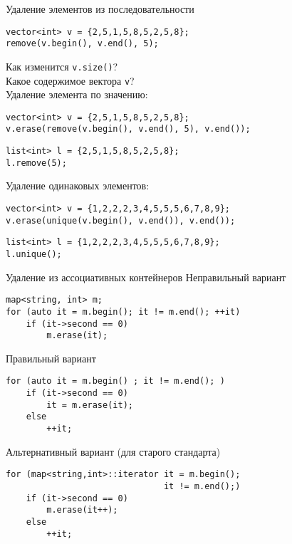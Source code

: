 \documentclass[aspectration=1610,t]{beamer}
\begin{document}
\begin{frame}[fragile]{Удаление элементов из последовательности}
\begin{lstlisting}
vector<int> v = {2,5,1,5,8,5,2,5,8};
remove(v.begin(), v.end(), 5);
\end{lstlisting}
Как изменится \texttt{v.size()}?\quad {}\\ 
Какое содержимое вектора \texttt{v}?\quad {}
\pause\pause\\\medskip
Удаление элемента по значению:
\begin{lstlisting}
vector<int> v = {2,5,1,5,8,5,2,5,8};
v.erase(remove(v.begin(), v.end(), 5), v.end());
\end{lstlisting}
\begin{lstlisting}
list<int> l = {2,5,1,5,8,5,2,5,8};
l.remove(5);
\end{lstlisting}
\pause
Удаление одинаковых элементов:
\begin{lstlisting}
vector<int> v = {1,2,2,2,3,4,5,5,5,6,7,8,9};
v.erase(unique(v.begin(), v.end()), v.end());
\end{lstlisting}
\begin{lstlisting}
list<int> l = {1,2,2,2,3,4,5,5,5,6,7,8,9};
l.unique();
\end{lstlisting}
\end{frame}


\begin{frame}[fragile]{Удаление из ассоциативных контейнеров}
Неправильный вариант
\begin{lstlisting}
map<string, int> m;
for (auto it = m.begin(); it != m.end(); ++it)
    if (it->second == 0)
        m.erase(it);
\end{lstlisting}
\pause
Правильный вариант
\begin{lstlisting}
for (auto it = m.begin() ; it != m.end(); )
    if (it->second == 0) 
        it = m.erase(it);
    else
        ++it;
\end{lstlisting}
\pause
Альтернативный вариант (для старого стандарта)
\begin{lstlisting}
for (map<string,int>::iterator it = m.begin(); 
                               it != m.end();)
    if (it->second == 0) 
        m.erase(it++);
    else                 
        ++it;
\end{lstlisting}
\end{frame}

%
%    
\end{document}
